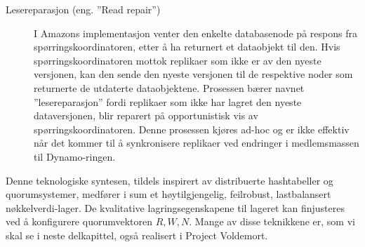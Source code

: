 \begin{description}
  \item [Lesereparasjon (eng. ''Read repair'')] I Amazons implementasjon venter den enkelte databasenode på respons fra spørringskoordinatoren, etter å ha returnert et dataobjekt til den. Hvis spørringskoordinatoren mottok replikaer som ikke er av den nyeste versjonen, kan den sende den nyeste versjonen til de respektive noder som returnerte de utdaterte dataobjektene. Prosessen bærer navnet ''lesereparasjon'' fordi replikaer som ikke har lagret den nyeste dataversjonen, blir reparert på opportunistisk vis av spørringskoordinatoren. Denne prosessen kjøres ad-hoc og er ikke effektiv når det kommer til å synkronisere replikaer ved endringer i medlemsmassen til Dynamo-ringen.
\end{description}

Denne teknologiske syntesen, tildels inspirert av distribuerte hashtabeller og quorumsystemer, medfører i sum et høytilgjengelig, feilrobust, lastbalansert nøkkelverdi-lager. De kvalitative lagringsegenskapene til lageret kan finjusteres ved å konfigurere quorumvektoren \(R, W, N\). Mange av disse teknikkene er, som vi skal se i neste delkapittel, også realisert i Project Voldemort.

